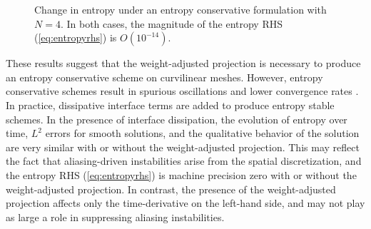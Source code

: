 \documentclass[10pt]{amsart}
\theoremstyle{definition}
\theoremstyle{lemma}
\theoremstyle{theorem}
\theoremstyle{assumption}
\newcommand{\LRp}[1]{\left( #1 \right)}
\begin{document}
{\begin{figure}
{
}
\caption{Change in entropy under an entropy conservative formulation with $N=4$.  In both cases, the magnitude of the entropy RHS (\ref{eq:entropyrhs}) is $O\LRp{10^{-14}}$. }
\label{fig:dSconverge}
\end{figure}

These results suggest that the weight-adjusted projection is necessary to produce an entropy conservative scheme on curvilinear meshes.  However, entropy conservative schemes result in spurious oscillations and lower convergence rates \cite{chan2017discretely}.  In practice, dissipative interface terms are added to produce entropy stable schemes.  In the presence of interface dissipation, the evolution of entropy over time, $L^2$ errors for smooth solutions, and the qualitative behavior of the solution are very similar with or without the weight-adjusted projection.  This may reflect the fact that aliasing-driven instabilities arise from the spatial discretization, and the entropy RHS (\ref{eq:entropyrhs}) is machine precision zero with or without the weight-adjusted projection.  In contrast,  the presence of the weight-adjusted projection affects only the time-derivative on the left-hand side, and may not play as large a role in suppressing aliasing instabilities.  


}
\end{document}

